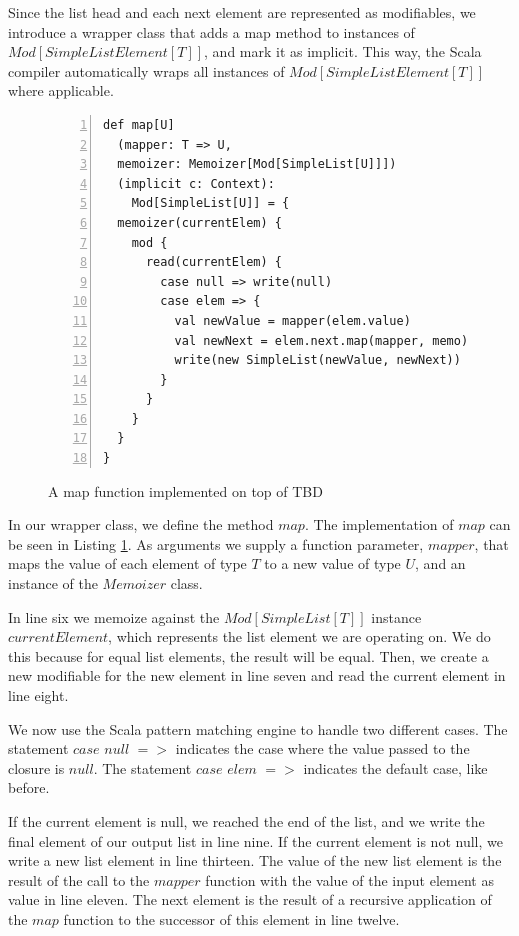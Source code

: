 Since the list head and each next element are represented as modifiables, we introduce a wrapper class that adds a map method to instances of $Mod[SimpleListElement[T]]$, and mark it as implicit. This way, the Scala compiler automatically wraps all instances of $Mod[SimpleListElement[T]]$ where applicable. 

\begin{figure}
\begin{lstlisting}[frame=single,basicstyle=\ttfamily,numbers=left,mathescape=true]
def map[U]
  (mapper: T => U, 
  memoizer: Memoizer[Mod[SimpleList[U]]])
  (implicit c: Context):
    Mod[SimpleList[U]] = {
  memoizer(currentElem) {
    mod {
      read(currentElem) {
        case null => write(null)
        case elem => {
          val newValue = mapper(elem.value)
          val newNext = elem.next.map(mapper, memo)
          write(new SimpleList(newValue, newNext))
        }
      }
    }
  }
}
\end{lstlisting}
\caption{A map function implemented on top of TBD}
\label{code:map_example}
\end{figure}

In our wrapper class, we define the method $map$. The implementation of $map$ can be seen in Listing \ref{code:map_example}. As arguments we supply a function parameter, $mapper$, that maps the value of each element of type $T$ to a new value of type $U$, and an instance of the $Memoizer$ class. 

In line six we memoize against the $Mod[SimpleList[T]]$ instance $currentElement$, which represents the list element we are operating on. We do this because for equal list elements, the result will be equal. Then, we create a new modifiable for the new element in line seven and read the current element in line eight. 

We now use the Scala pattern matching engine to handle two different cases. The statement $case$ $null$ $=>$ indicates the case where the value passed to the closure is $null$. The statement $case$ $elem$ $=>$ indicates the default case, like before. 

If the current element is null, we reached the end of the list, and we write the final element of our output list in line nine. If the current element is not null, we write a new list element in line thirteen. The value of the new list element is the result of the call to the $mapper$ function with the value of the input element as value in line eleven. The next element is the result of a recursive application of the $map$ function to the successor of this element in line twelve. 

